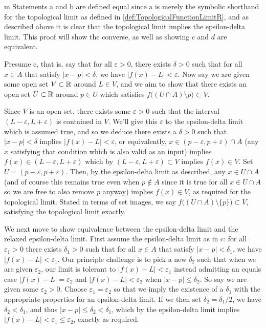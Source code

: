\documentclass[11pt]{article}
\begin{document}
\begin{my proof}{m}
Statements a and b are defined equal since a is merely the symbolic shorthand for the topological limit as defined in \ref{def:TopologicalFunctionLimitR}, and as described above it is clear that the topological limit implies the epsilon-delta limit. This proof will show the converse, as well as showing $c$ and $d$ are equivalent.

Presume c, that is, say that for all $\varepsilon > 0$, there exists $\delta > 0$ such that for all $x \in A$ that satisfy $|x-p| < \delta$, we have $|f(x) - L| < \varepsilon$. Now say we are given some open set $V \subset \mathbb{R}$ around $L \in V$, and we aim to show that there exists an open set $U \subset \mathbb{R}$ around $p \in U$ which satisfies $f\big((U \cap A) \setminus {p} \big) \subset V$.

Since $V$ is an open set, there exists some $\varepsilon > 0$ such that the interval $(L - \varepsilon, L + \varepsilon)$ is contained in $V$. We'll give this $\varepsilon$ to the epsilon-delta limit which is assumed true, and so we deduce there exists a $\delta > 0$ such that $|x - p| < \delta$ implies $|f(x) - L| < \varepsilon$, or equivalently, $x \in (p -\varepsilon, p + \varepsilon) \cap A$ (any $x$ satisfying that condition which is also valid as an input) implies $f(x) \in (L - \varepsilon, L + \varepsilon)$ which by $(L - \varepsilon, L + \varepsilon) \subset V$ implies $f(x) \in V$. Set $U = (p -\varepsilon, p + \varepsilon)$. Then, by the epsilon-delta limit as described, any $x \in U \cap A$ (and of course this remains true even when $p \notin A$ since it is true for all $x \in U \cap A$ so we are free to also remove $p$ anyway) implies $f(x) \in V$, as required for the topological limit. Stated in terms of set images, we say $f\big((U \cap A) \setminus \{p\} \big) \subset V$, satisfying the topological limit exactly.

We next move to show equivalence between the epsilon-delta limit and the relaxed epsilon-delta limit. First assume the epsilon-delta limit as in c: for all $\varepsilon_1 > 0$ there exists $\delta_1 > 0$ such that for all $x \in A$ that satisfy $|x - p|< \delta_1$, we have $|f(x) - L| < \varepsilon_1$. Our principle challenge is to pick a new $\delta_2$ such that when we are given $\varepsilon_2$, our limit is tolerant to $|f(x)-L| < \varepsilon_1$ instead admitting an equals case $|f(x)-L| = \varepsilon_2$ and $|f(x)-L| < \varepsilon_2$ when $|x - p| \le \delta_2$. So say we are given some $\varepsilon_2 > 0$. Choose $\varepsilon_1 = \varepsilon_2$ so that we imply the existence of a $\delta_1$ with the appropriate properties for an epsilon-delta limit. If we then set $\delta_2 = \delta_1/2$, we have $\delta_2 < \delta_1$, and thus $|x - p| \le \delta_2 < \delta_1$, which by the epsilon-delta limit implies $|f(x) - L| < \varepsilon_1 \le \varepsilon_2$, exactly as required.


\end{my proof}
\end{document}
